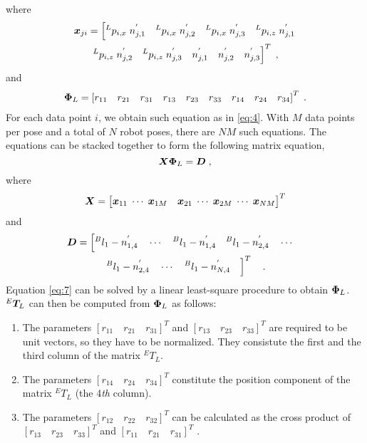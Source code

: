 where 
\begin{multline}
  \vb*{x}_{ji} = \left[{^L}p_{i,x}\;n^{'}_{j,1} \quad {^L}p_{i,x}\;n^{'}_{j,2}\quad {^L}p_{i,x}\;n^{'}_{j,3}\quad  {^L}p_{i,z}\;n^{'}_{j,1}\right. \\ 
\left. {^L}p_{i,z}\;n^{'}_{j,2}\quad {^L}p_{i,z}\;n^{'}_{j,3} \quad n^{'}_{j,1} \quad n^{'}_{j,2} \quad n^{'}_{j,3} \right]^T \; , 
\end{multline}
and
\begin{multline}
  \vb*{\Phi}_L= \left[r_{11} \quad r_{21} \quad r_{31} \quad r_{13} \quad r_{23} \quad r_{33} \quad r_{14} \quad r_{24}  \quad r_{34} \right] ^T \; .
\end{multline}
For each data point $i$, we obtain such equation as in \eqref{eq:4}. With $M$ data points per pose and a total of $N$ robot poses, there are $NM$ such equations. The equations can be stacked together to form the following matrix equation,
\begin{equation}
\label{eq:7}
  \vb*{X}   \vb*{\Phi}_L= \vb*{D} \; ,
\end{equation}
where 
\begin{equation}
\vb*{X} =\begin{bmatrix}
{\vb*{x}_{11}} \; \cdots \;{\vb*{x}_{1M}}\quad  {\vb*{x}_{21}} \; \cdots \; {\vb*{x}_{2M}}\;  \cdots \; {\vb*{x}_{NM}} 
\end{bmatrix}^T 
\end{equation}
and 
\begin{multline}
\vb*{D} =\left[
{^B}l_1 -  n^{'}_{1,4} \quad
\cdots \quad
{^B}l_1 -  n^{'}_{1,4} \quad
{^B}l_1 -  n^{'}_{2,4} \quad
\cdots  \quad
\right. \\
\left.
{^B}l_1 -  n^{'}_{2,4} \quad
\cdots \quad
{^B}l_1 -  n^{'}_{N,4} \quad  
\right]^T \quad .
\end{multline}
Equation \eqref{eq:7} can be solved by a linear least-square procedure to obtain $\vb*{\Phi}_L$. ${^E}\vb*{T}_L$ can then be computed from $\vb*{\Phi}_L$ as follows:
\begin{enumerate}
\item The parameters $[r_{11} \quad r_{21} \quad r_{31}]^T$ and $[r_{13} \quad r_{23} \quad r_{33}]^T$ are required to be unit vectors, so they have to be normalized. They consistute the first and the third column of the matrix ${^E}T_L$.
\item The parameters $[r_{14} \quad r_{24} \quad r_{34}]^T$ constitute the position component of the matrix ${^E}T_L$ (the 4\textit{th} column).
\item The parameters $[r_{12} \quad r_{22} \quad r_{32}]^T$ can be calculated as the cross product of  $[r_{13} \quad r_{23} \quad r_{33}]^T$ and $[r_{11} \quad r_{21} \quad r_{31}]^T$ .
\end{enumerate}

